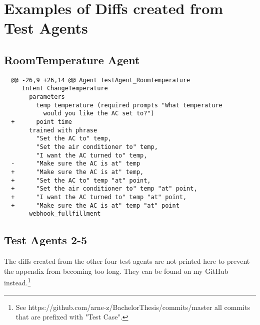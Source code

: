 \chapter{Examples of Diffs created from Test Agents}

\section{RoomTemperature Agent}
\label{RoomTemperature Agent DSLDiff}

\begin{lstlisting}
  @@ -26,9 +26,14 @@ Agent TestAgent_RoomTemperature
     Intent ChangeTemperature
       parameters 
         temp temperature (required prompts "What temperature 
           would you like the AC set to?")
  +      point time
       trained with phrase 
         "Set the AC to" temp, 
         "Set the air conditioner to" temp, 
         "I want the AC turned to" temp, 
  -      "Make sure the AC is at" temp
  +      "Make sure the AC is at" temp,
  +      "Set the AC to" temp "at" point, 
  +      "Set the air conditioner to" temp "at" point,
  +      "I want the AC turned to" temp "at" point,
  +      "Make sure the AC is at" temp "at" point
       webhook_fullfillment
\end{lstlisting}

\section{Test Agents 2-5}
The diffs created from the other four test agents are not printed here to prevent the appendix from becoming too long. They can be found on my GitHub instead.\footnote{See https://github.com/arne-z/BachelorThesis/commits/master all commits that are prefixed with "Test Case".}
